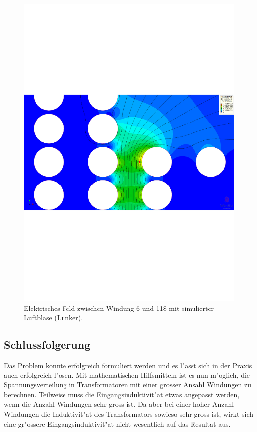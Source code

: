 \begin{refsection}
\begin{figure}
	\centering
	\includegraphics[width=\textwidth]{./trafo/images/VoltageTrans_bubble_turn6_10u_9u.pdf}
	\caption{Elektrisches Feld zwischen Windung 6 und 118 mit simulierter Luftblase (Lunker).}
	\label{trafo:E-FieldBubble}
\end{figure}

\subsection{Schlussfolgerung}
Das Problem konnte erfolgreich formuliert werden und es l"asst sich in der Praxis auch erfolgreich l"osen. Mit mathematischen Hilfsmitteln ist es nun m"oglich, die Spannungsverteilung in Transformatoren mit einer grosser Anzahl Windungen zu berechnen. Teilweise muss die Eingangsinduktivit"at etwas angepasst werden, wenn die Anzahl Windungen sehr gross ist. Da aber bei einer hoher Anzahl Windungen die Induktivit"at des Transformators sowieso sehr gross ist, wirkt sich eine gr"ossere Eingangsinduktivit"at nicht wesentlich auf das Resultat aus.


\end{refsection}
